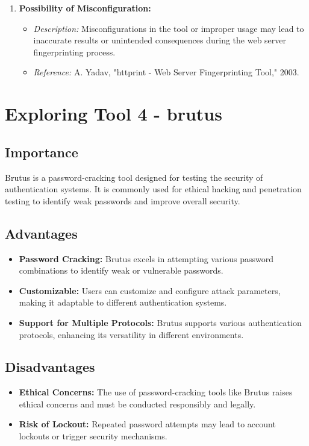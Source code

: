 \documentclass[11pt]{article}
\begin{document}
\begin{enumerate}
    \item \textbf{Possibility of Misconfiguration:}
    \begin{itemize}
        \item \textit{Description:} Misconfigurations in the tool or improper usage may lead to inaccurate results or unintended consequences during the web server fingerprinting process.
        \item \textit{Reference:} A. Yadav, "httprint - Web Server Fingerprinting Tool," 2003.
    \end{itemize}
\end{enumerate}

\section{Exploring Tool 4 - brutus}
\subsection{Importance}
Brutus is a password-cracking tool designed for testing the security of authentication systems. It is commonly used for ethical hacking and penetration testing to identify weak passwords and improve overall security.

\subsection{Advantages}
\begin{itemize}
    \item \textbf{Password Cracking:} Brutus excels in attempting various password combinations to identify weak or vulnerable passwords.
    \item \textbf{Customizable:} Users can customize and configure attack parameters, making it adaptable to different authentication systems.
    \item \textbf{Support for Multiple Protocols:} Brutus supports various authentication protocols, enhancing its versatility in different environments.
\end{itemize}

\subsection{Disadvantages}
\begin{itemize}
    \item \textbf{Ethical Concerns:} The use of password-cracking tools like Brutus raises ethical concerns and must be conducted responsibly and legally.
    \item \textbf{Risk of Lockout:} Repeated password attempts may lead to account lockouts or trigger security mechanisms.
\end{itemize}
\end{document}
